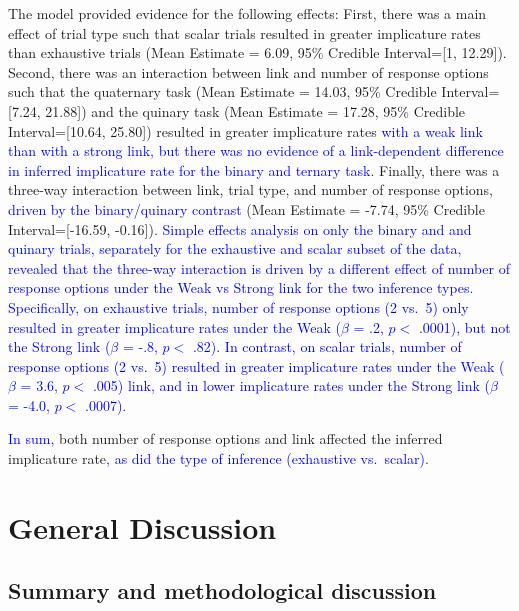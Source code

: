 \documentclass[man]{apa6}
\newcommand{\change}[1]{\textcolor{Blue}{#1}}
\theoremstyle{definition}
\theoremstyle{definition}
\theoremstyle{definition}
\theoremstyle{remark}
\begin{document}
The model provided evidence for the following effects: First, there was
a main effect of trial type such that scalar trials resulted in greater
implicature rates than exhaustive trials (Mean Estimate = 6.09, 95\%
Credible Interval={[}1, 12.29{]}). Second, there was an interaction
between link and number of response options such that the quaternary
task (Mean Estimate = 14.03, 95\% Credible Interval={[}7.24, 21.88{]})
and the quinary task (Mean Estimate = 17.28, 95\% Credible
Interval={[}10.64, 25.80{]}) resulted in greater
implicature rates \change{with a weak link than with a strong link, but there was no evidence of a link-dependent difference in inferred implicature rate for the binary and ternary task}. Finally, there was a three-way interaction between
link, trial type, and number of response options, \change{driven by the binary/quinary contrast} (Mean Estimate = -7.74,
95\% Credible Interval={[}-16.59, -0.16{]}). \change{Simple effects analysis on only the binary and and quinary trials, separately for the exhaustive and scalar subset of the data, revealed that the three-way interaction is driven by a different effect of number of response options under the Weak vs Strong link for the two inference types. Specifically, on exhaustive trials, number of response options (2 vs.~5) only resulted in greater implicature rates under the Weak ($\beta$ = .2, $p <$ .0001), but not the Strong link ($\beta$ = -.8, $p <$ .82). In contrast, on scalar trials, number of response options (2 vs.~5) resulted in greater implicature rates under the Weak ($\beta$ = 3.6, $p <$ .005) link, and in lower implicature rates under the Strong link ($\beta$ = -4.0, $p <$ .0007).}

\change{In sum,} both number of response options and link
affected the inferred implicature rate\change{, as did the type of inference (exhaustive vs.~scalar)}.

\section{General Discussion}\label{general-discussion}

\subsection{Summary and methodological
discussion}\label{summary-and-methodological-discussion}
\end{document}
